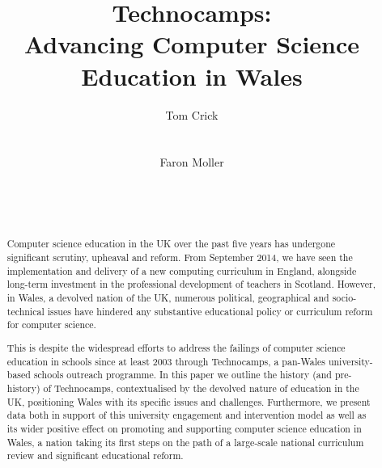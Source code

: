 \documentclass{sig-alternate}
\begin{document}
%

\title{Technocamps: \\[1ex] Advancing Computer Science Education in Wales}


\author{
\alignauthor
Tom Crick\\
\\
\\
\alignauthor
Faron Moller\\
\\
\\
\\
}

\maketitle

\begin{abstract}
Computer science education in the UK over the past five years has
undergone significant scrutiny, upheaval and reform. From September
2014, we have seen the implementation and delivery of a new computing
curriculum in England, alongside long-term investment in the
professional development of teachers in Scotland. However, in Wales, a
devolved nation of the UK, numerous political, geographical and
socio-technical issues have hindered any substantive educational
policy or curriculum reform for computer science.

This is despite the widespread efforts to address the failings of
computer science education in schools since at least 2003 through
Technocamps, a pan-Wales university-based schools outreach
programme. In this paper we outline the history (and pre-history) of
Technocamps, contextualised by the devolved nature of education in the
UK, positioning Wales with its specific issues and
challenges. Furthermore, we present data both in support of this
university engagement and intervention model as well as its wider
positive effect on promoting and supporting computer science education
in Wales, a nation taking its first steps on the path of a large-scale
national curriculum review and significant educational reform.
\end{abstract}
\end{document}
